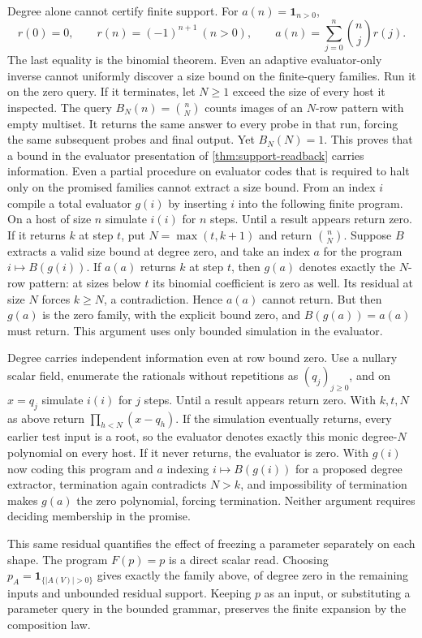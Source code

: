 \documentclass[11pt,a4paper]{article}
\theoremstyle{definition}
\theoremstyle{remark}\newaliascnt{remark}{theorem}
\numberwithin{equation}{section}
\begin{document}
Degree alone cannot certify finite support. For \(a(n)=\mathbf1_{n>0}\),
\[
 r(0)=0,\qquad r(n)=(-1)^{n+1}\ (n>0),\qquad
 a(n)=\sum_{j=0}^n\binom nj r(j).
\]
The last equality is the binomial theorem. Even an adaptive evaluator-only inverse cannot uniformly discover a size bound on the finite-query families. Run it on the zero query. If it terminates, let \(N\ge1\) exceed the size of every host it inspected. The query \(B_N(n)=\binom nN\) counts images of an \(N\)-row pattern with empty multiset. It returns the same answer to every probe in that run, forcing the same subsequent probes and final output. Yet \(B_N(N)=1\). This proves that a bound in the evaluator presentation of \cref{thm:support-readback} carries information.
Even a partial procedure on evaluator codes that is required to halt only on the promised families cannot extract a size bound. From an index $i$ compile a total evaluator $g(i)$ by inserting $i$ into the following finite program. On a host of size $n$ simulate $i(i)$ for $n$ steps. Until a result appears return zero. If it returns $k$ at step $t$, put $N=\max(t,k+1)$ and return $\binom nN$. Suppose $B$ extracts a valid size bound at degree zero, and take an index $a$ for the program $i\mapsto B(g(i))$. If $a(a)$ returns $k$ at step $t$, then $g(a)$ denotes exactly the $N$-row pattern: at sizes below $t$ its binomial coefficient is zero as well. Its residual at size $N$ forces $k\ge N$, a contradiction. Hence $a(a)$ cannot return. But then $g(a)$ is the zero family, with the explicit bound zero, and $B(g(a))=a(a)$ must return. This argument uses only bounded simulation in the evaluator.

Degree carries independent information even at row bound zero. Use a nullary scalar field, enumerate the rationals without repetitions as $(q_j)_{j\ge0}$, and on $x=q_j$ simulate $i(i)$ for $j$ steps. Until a result appears return zero. With $k,t,N$ as above return $\prod_{h<N}(x-q_h)$. If the simulation eventually returns, every earlier test input is a root, so the evaluator denotes exactly this monic degree-$N$ polynomial on every host. If it never returns, the evaluator is zero. With $g(i)$ now coding this program and $a$ indexing $i\mapsto B(g(i))$ for a proposed degree extractor, termination again contradicts $N>k$, and impossibility of termination makes $g(a)$ the zero polynomial, forcing termination. Neither argument requires deciding membership in the promise.
 
This same residual quantifies the effect of freezing a parameter separately on each shape. The program \(F(p)=p\) is a direct scalar read. Choosing \(p_A=\mathbf1_{\{|A(V)|>0\}}\) gives exactly the family above, of degree zero in the remaining inputs and unbounded residual support. Keeping \(p\) as an input, or substituting a parameter query in the bounded grammar, preserves the finite expansion by the composition law.
\end{document}
